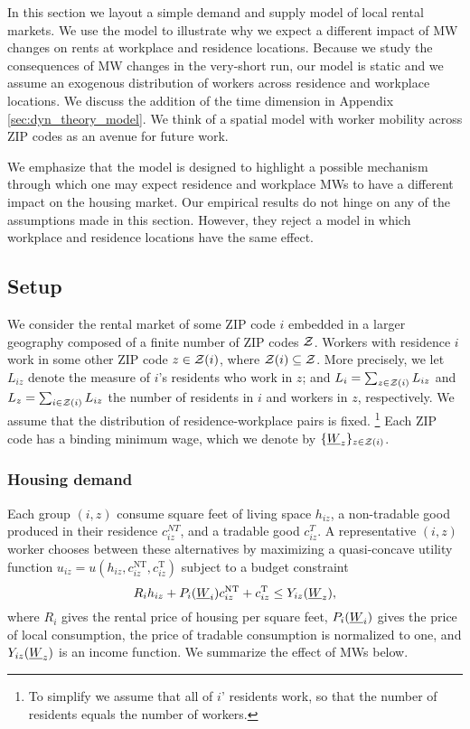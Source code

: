 
In this section we layout a simple demand and supply model of local rental markets.
We use the model to illustrate why we expect a different impact of MW changes 
on rents at workplace and residence locations.
Because we study the consequences of MW changes in the very-short run, our model is 
static and we assume an exogenous distribution of workers across residence and 
workplace locations.
We discuss the addition of the time dimension in Appendix \ref{sec:dyn_theory_model}.
We think of  a spatial model with worker mobility across ZIP codes as an avenue 
for future work.

We emphasize that the model is designed to highlight a possible mechanism through 
which one may expect residence and workplace MWs to have a different impact on the 
housing market.
Our empirical results do not hinge on any of the assumptions made in this section.
However, they reject a model in which workplace and residence locations have the 
same effect.

\subsection{Setup}

We consider the rental market of some ZIP code $i$ embedded in a larger geography 
composed of a finite number of ZIP codes $\mathcal{Z}$.
Workers with residence $i$ work in some other ZIP code $z\in\mathcal{Z}(i)$, where 
$\mathcal{Z}(i)\subseteq\mathcal{Z}$.
More precisely, we let $L_{iz}$ denote the measure of $i$'s residents who work in 
$z$; and 
$L_i = \sum_{z \in \mathcal{Z}(i)} L_{iz}$ and $L_z = \sum_{i \in \mathcal{Z}(i)} L_{iz}$ the number
of residents in $i$ and workers in $z$, respectively.
We assume that the distribution of residence-workplace pairs is fixed.%
\footnote{To simplify we assume that all of $i$' residents work, so that the number
of residents equals the number of workers.}
Each ZIP code has a binding minimum wage, which we denote by $\{\underline{W}_z\}_{z\in\mathcal{Z}(i)}$.

\subsubsection*{Housing demand}

Each group $(i,z)$ consume
square feet of living space $h_{iz}$, 
a non-tradable good produced in their residence $c_{iz}^{NT}$, and
a tradable good $c_{iz}^T$.
A representative $(i,z)$ worker chooses between these alternatives by maximizing
a quasi-concave utility function 
$u_{iz} = u \left(h_{iz}, c^{\text{NT}}_{iz}, c^{\text{T}}_{iz}\right)$
subject to a budget constraint
$$R_i h_{iz} + P_i(\underline{W}_i) c^{\text{NT}}_{iz} + c^{\text{T}}_{iz} \leq Y_{iz}(\underline{W}_z),$$
where
$R_i$ gives the rental price of housing per square feet,
$P_i(\underline{W}_i)$ gives the price of local consumption,
the price of tradable consumption is normalized to one, and 
$Y_{iz}(\underline{W}_z)$ is an income function.
We summarize the effect of MWs below.

